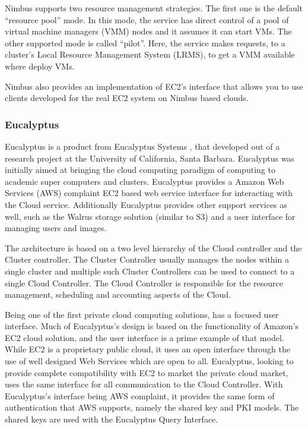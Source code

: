 Nimbus supports two resource management strategies. The first one is the default ``resource pool'' mode. In this mode, the service has direct control of a pool of virtual machine managers (VMM) nodes and it assumes it can start VMs. The other supported mode is called ``pilot''. Here, the service makes requests, to a cluster's Local Resource Management System (LRMS), to get a VMM available where deploy VMs.

Nimbus also provides an implementation of EC2's interface that allows you to use clients developed for the real EC2 system on Nimbus based clouds.

\subsubsection{Eucalyptus}


Eucalyptus is a product from Eucalyptus Systems  \cite{nurmi2008eos, eucapyltuswp, www/eucalyptus}, that developed out of a research project at the University of California, Santa Barbara. Eucalyptus was initially aimed at bringing the cloud computing paradigm of computing to academic super computers and clusters. Eucalyptus provides a Amazon Web Services (AWS) complaint EC2 based web service interface for interacting with the Cloud service. Additionally Eucalyptus provides other support services as well, such as the Walrus storage solution (similar to S3) and a user interface for managing users and images. 

 
The architecture is based on a two level hierarchy of the Cloud controller and the Cluster controller. The Cluster Controller usually manages the nodes within a single cluster and multiple such Cluster Controllers can be used to connect to a single Cloud Controller. The Cloud Controller is responsible for the resource management, scheduling and accounting aspects of the Cloud.
 
Being one of the first private cloud computing solutions, has a focused user interface.  Much of Eucalyptus's design is based on the functionality of Amazon's EC2 cloud solution, and the user interface is a prime example of that model.  While EC2 is a proprietary public cloud, it uses an open interface through the use of well designed Web Services which are open to all. Eucalyptus, looking to provide complete compatibility with EC2 to market the private cloud market, uses the same interface for all communication to the Cloud Controller.  With Eucalyptus's interface being AWS complaint, it provides the same form of authentication that AWS supports, namely the shared key and PKI  models. The shared keys are used with the Eucalyptus Query Interface. 


